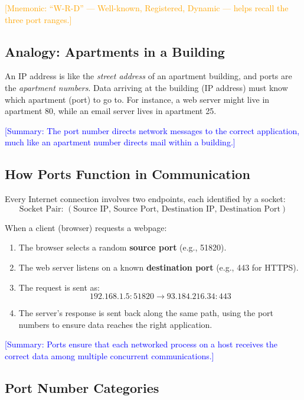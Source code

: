 \documentclass[12pt]{article}
\begin{document}
\textcolor{orange}{[Mnemonic: ``W-R-D'' — Well-known, Registered, Dynamic — helps recall the three port ranges.]}

\subsection{Analogy: Apartments in a Building}
An IP address is like the \textit{street address} of an apartment building, and ports are the \textit{apartment numbers}. Data arriving at the building (IP address) must know which apartment (port) to go to. For instance, a web server might live in apartment 80, while an email server lives in apartment 25.

\textcolor{blue}{[Summary: The port number directs network messages to the correct application, much like an apartment number directs mail within a building.]}

\subsection{How Ports Function in Communication}
Every Internet connection involves two endpoints, each identified by a socket:
\[
    \text{Socket Pair: } ( \text{Source IP, Source Port, Destination IP, Destination Port} )
\]

When a client (browser) requests a webpage:
\begin{enumerate}
    \item The browser selects a random \textbf{source port} (e.g., 51820).
    \item The web server listens on a known \textbf{destination port} (e.g., 443 for HTTPS).
    \item The request is sent as:
          \[
              192.168.1.5:51820 \rightarrow 93.184.216.34:443
          \]
    \item The server’s response is sent back along the same path, using the port numbers to ensure data reaches the right application.
\end{enumerate}

\textcolor{blue}{[Summary: Ports ensure that each networked process on a host receives the correct data among multiple concurrent communications.]}

\subsection{Port Number Categories}
\end{document}
